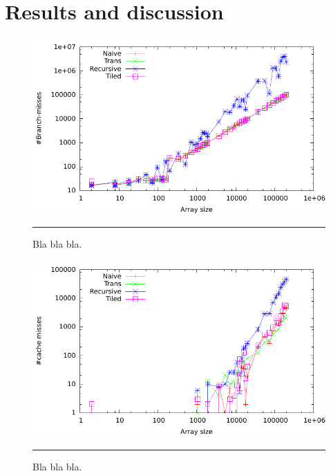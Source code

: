 \section{Results and discussion}



\begin{figure}[htbp]
	\centering
		\includegraphics[width=\textwidth]{./Figures/Project2a/Branch_misses.pdf}
		\rule{35em}{0.5pt}
	\caption[Branch misses]{
	Bla bla bla.
	}
	\label{fig:Branch_misses}
\end{figure}


\begin{figure}[htbp]
	\centering
		\includegraphics[width=\textwidth]{./Figures/Project2a/Cache_misses.pdf}
		\rule{35em}{0.5pt}
	\caption[Cache misses]{
	Bla bla bla.
	}
	\label{fig:Cache_misses}
\end{figure}



